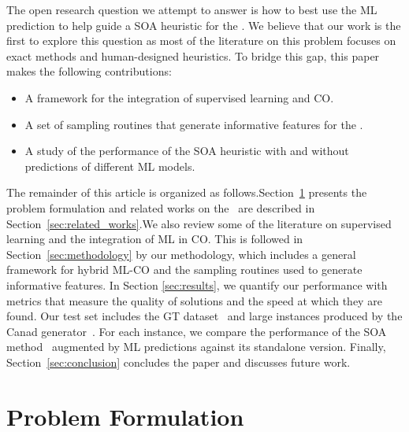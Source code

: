 \documentclass[3p, authoryear, times, doubleblind]{elsarticle}
\begin{document}
{The open research question we attempt to answer is how to best use the ML prediction to help guide a SOA heuristic for the \fcn. We believe that our work is the first to explore this question as most of the literature on this problem focuses on exact methods and human-designed heuristics.  To bridge this gap, this paper makes the following contributions: 
\startblue
\begin{itemize}
    \item A framework for the integration of supervised learning and CO. 
    \item A set of sampling routines that generate informative features for the \fcn. 
    \item A study of the performance of the SOA heuristic with and without predictions of different ML models.
\end{itemize}
\stopblue

The remainder of this article is organized as follows.\startblue Section~\ref{sec:fcn_problem_formulation} presents the problem formulation and related works on the \fcn\ are described in Section~\ref{sec:related_works}.\stopblue We also review some of the literature on supervised learning and the integration of ML in CO. This is followed in Section~\ref{sec:methodology} by our methodology, which includes a general framework for hybrid ML-CO and the sampling routines used to generate informative features. In Section \ref{sec:results}, we quantify our performance with metrics that measure the quality of solutions and the speed at which they are found. Our test set includes the GT dataset~\citep{hewitt_combining_2010} and large instances produced by the Canad generator~\citep{larsen_pseudo-random_2023}. For each instance, we compare the performance of the SOA method~\citep{katayama_mip_2020} augmented by ML predictions against its standalone version. Finally, Section~\ref{sec:conclusion} concludes the paper and discusses future work.

\startblue 
\section{Problem Formulation} \label{sec:fcn_problem_formulation}
\stopblue 

}
\end{document}
